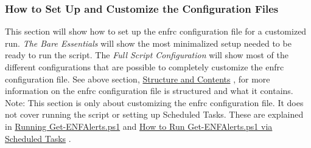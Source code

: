 \documentclass[a4paper,12pt]{report}
\begin{document}
\subsubsection*{How to Set Up and Customize the Configuration Files}
 \par
This section will show how to set up the enfrc configuration file for a customized run. \textit{The Bare Essentials} will show the most minimalized setup needed to be ready to run the script. The \textit{Full Script Configuration} will show most of the different configurations that are possible to completely customize the enfrc configuration file. See above section, \href{}{Structure and Contents}
, for more information on the enfrc configuration file is structured and what it contains. Note: This section is only about customizing the enfrc configuration file. It does not cover running the script or setting up Scheduled Tasks. These are explained in \href{}{Running Get-ENFAlerts.ps1}
 and \href{}{How to Run Get-ENFAlerts.ps1 via Scheduled Tasks}
. \par
\end{document}

